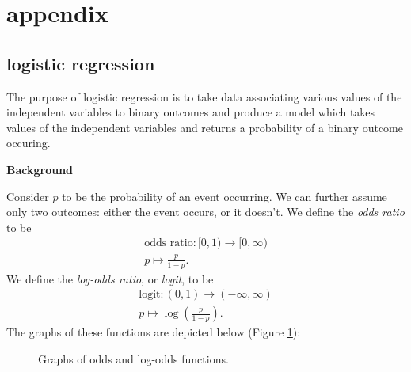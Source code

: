 \documentclass[12pt]{article}
\begin{document}


\section{appendix} %

\subsection{logistic regression} %

The purpose of logistic regression is to take data associating various values of the independent variables to binary outcomes and produce a model which takes values of the independent variables and returns a probability of a binary outcome occuring.

\textbf{Background}

Consider $p$ to be the probability of an event occurring. We can further assume only two outcomes: either the event occurs, or it doesn't. We define the \emph{odds ratio} to be 
\begin{gather*}
	\text{odds ratio}: [0, 1) \to [0,\infty) \\
	p \mapsto \frac{p}{1-p}.
\end{gather*}
We define the \emph{log-odds ratio}, or \emph{logit}, to be 
\begin{gather*}
	\text{logit}: (0, 1) \to (-\infty, \infty) \\
	p \mapsto \log\left(\frac{p}{1-p}\right).
\end{gather*}
The graphs of these functions are depicted below (Figure \ref{fig_odds_logodds_graphs}):
\begin{figure}[h]
\centering
{}
\caption{Graphs of odds and log-odds functions.}
\label{fig_odds_logodds_graphs}
\end{figure}
\end{document}
